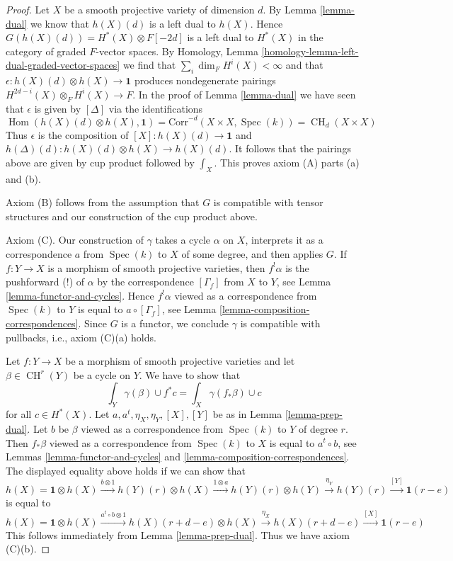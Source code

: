 \documentclass[10pt,a4paper]{amsart}
\theoremstyle{plain}
\theoremstyle{definition}
\theoremstyle{remark}
\numberwithin{equation}{subsection}
\def\Spec{\mathop{\mathrm{Spec}}}
\def\Hom{\mathop{\mathrm{Hom}}\nolimits}
\def\CH{\mathop{\mathrm{CH}}\nolimits}
\begin{document}
\begin{proof}
\medskip\noindent
Let $X$ be a smooth projective variety of dimension $d$.
By Lemma \ref{lemma-dual}
we know that $h(X)(d)$ is a left dual to $h(X)$. Hence
$G(h(X)(d)) = H^*(X) \otimes F[-2d]$ is a left dual to
$H^*(X)$ in the category of graded $F$-vector spaces.
By Homology, Lemma \ref{homology-lemma-left-dual-graded-vector-spaces}
we find that $\sum_i \dim_F H^i(X) < \infty$ and that
$\epsilon : h(X)(d) \otimes h(X) \to \mathbf{1}$ produces
nondegenerate pairings $H^{2d - i}(X) \otimes_F H^i(X) \to F$.
In the proof of Lemma \ref{lemma-dual} we have seen that
$\epsilon$ is given by $[\Delta]$ via the identifications
$$
\Hom(h(X)(d) \otimes h(X), \mathbf{1}) =
\text{Corr}^{-d}(X \times X, \Spec(k)) =
\CH_d(X \times X)
$$
Thus $\epsilon$ is the composition of $[X] : h(X)(d) \to \mathbf{1}$
and $h(\Delta)(d) : h(X)(d) \otimes h(X) \to h(X)(d)$. It follows
that the pairings above are given by cup product followed by
$\int_X$. This proves axiom (A) parts (a) and (b).

\medskip\noindent
Axiom (B) follows from the assumption that $G$ is compatible
with tensor structures and our construction of the cup product above.

\medskip\noindent
Axiom (C). Our construction of $\gamma$ takes a cycle $\alpha$ on $X$,
interprets it as a correspondence $a$ from $\Spec(k)$ to $X$ of some degree,
and then applies $G$. If $f : Y \to X$ is a morphism of smooth projective
varieties, then $f^!\alpha$ is the pushforward (!) of $\alpha$
by the correspondence $[\Gamma_f]$ from $X$ to $Y$, see
Lemma \ref{lemma-functor-and-cycles}. Hence
$f^!\alpha$ viewed as a correspondence from $\Spec(k)$ to $Y$
is equal to $a \circ [\Gamma_f]$, see
Lemma \ref{lemma-composition-correspondences}.
Since $G$ is a functor, we conclude
$\gamma$ is compatible with pullbacks, i.e., axiom (C)(a) holds.

\medskip\noindent
Let $f : Y \to X$ be a morphism of smooth projective varieties and
let $\beta \in \CH^r(Y)$ be a cycle on $Y$. We have to show that
$$
\int_Y \gamma(\beta) \cup f^*c = \int_X \gamma(f_*\beta) \cup c
$$
for all $c \in H^*(X)$. Let $a, a^t, \eta_X, \eta_Y, [X], [Y]$
be as in Lemma \ref{lemma-prep-dual}.
Let $b$ be $\beta$ viewed as a correspondence from $\Spec(k)$ to $Y$
of degree $r$. Then $f_*\beta$ viewed as a correspondence from
$\Spec(k)$ to $X$ is equal to $a^t \circ b$, see
Lemmas \ref{lemma-functor-and-cycles} and
\ref{lemma-composition-correspondences}.
The displayed equality above holds if we can show that
$$
h(X) = \mathbf{1} \otimes h(X)
\xrightarrow{b \otimes 1}
h(Y)(r) \otimes h(X)
\xrightarrow{1 \otimes a}
h(Y)(r) \otimes h(Y)
\xrightarrow{\eta_Y}
h(Y)(r)
\xrightarrow{[Y]}
\mathbf{1}(r - e)
$$
is equal to
$$
h(X) = \mathbf{1} \otimes h(X)
\xrightarrow{a^t \circ b \otimes 1}
h(X)(r + d - e) \otimes h(X)
\xrightarrow{\eta_X}
h(X)(r + d - e)
\xrightarrow{[X]}
\mathbf{1}(r - e)
$$
This follows immediately from Lemma \ref{lemma-prep-dual}.
Thus we have axiom (C)(b).


\end{proof}
\end{document}
